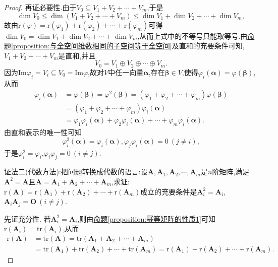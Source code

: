\documentclass[../../main.tex]{subfiles}
\begin{document}
\begin{proof}
再证必要性.由于\(V_0\subseteq V_1 + V_2+\cdots+V_m\),于是
\[
\dim V_0\leq\dim(V_1 + V_2+\cdots+V_m)\leq\dim V_1+\dim V_2+\cdots+\dim V_m,
\]
故由\(\text{r}(\varphi)=\text{r}(\varphi_1)+\text{r}(\varphi_2)+\cdots+\text{r}(\varphi_m)\)可得\(\dim V_0=\dim V_1+\dim V_2+\cdots+\dim V_m\),从而上式中的不等号只能取等号.由\hyperref[proposition:与全空间维数相同的子空间等于全空间]{命题\ref{proposition:与全空间维数相同的子空间等于全空间}}及直和的充要条件可知,\(V_1 + V_2+\cdots+V_m\)是直和,并且
\[
V_0 = V_1\oplus V_2\oplus\cdots\oplus V_m.
\]
因为\(\text{Im}\varphi_i = V_i\subseteq V_0 = \text{Im}\varphi\),故对\(V\)中任一向量\(\boldsymbol{\alpha}\),存在\(\boldsymbol{\beta}\in V\),使得\(\varphi_i(\boldsymbol{\alpha})=\varphi(\boldsymbol{\beta})\),从而
\begin{align*}
\varphi_i(\boldsymbol{\alpha})&=\varphi(\boldsymbol{\beta})=\varphi^2(\boldsymbol{\beta})=(\varphi_1+\varphi_2+\cdots+\varphi_m)\varphi(\boldsymbol{\beta})\\
&=(\varphi_1+\varphi_2+\cdots+\varphi_m)\varphi_i(\boldsymbol{\alpha})\\
&=\varphi_1\varphi_i(\boldsymbol{\alpha})+\varphi_2\varphi_i(\boldsymbol{\alpha})+\cdots+\varphi_m\varphi_i(\boldsymbol{\alpha}).
\end{align*}
由直和表示的唯一性可知
\[
\varphi_i^2(\boldsymbol{\alpha})=\varphi_i(\boldsymbol{\alpha}),\varphi_j\varphi_i(\boldsymbol{\alpha}) = 0\ (j\neq i),
\]
于是\(\varphi_i^2 = \varphi_i\),\(\varphi_i\varphi_j = 0\ (i\neq j)\).

{\color{blue}证法二(代数方法):}把问题转换成代数的语言:设\(\boldsymbol{A},\boldsymbol{A}_1,\boldsymbol{A}_2,\cdots,\boldsymbol{A}_m\)是\(n\)阶矩阵,满足\(\boldsymbol{A}^2 = \boldsymbol{A}\)且\(\boldsymbol{A}=\boldsymbol{A}_1+\boldsymbol{A}_2+\cdots+\boldsymbol{A}_m\),求证:\(\text{r}(\boldsymbol{A})=\text{r}(\boldsymbol{A}_1)+\text{r}(\boldsymbol{A}_2)+\cdots+\text{r}(\boldsymbol{A}_m)\)成立的充要条件是\(\boldsymbol{A}_i^2 = \boldsymbol{A}_i\),\(\boldsymbol{A}_i\boldsymbol{A}_j = \boldsymbol{O}\ (i\neq j)\).

先证充分性. 若\(\boldsymbol{A}_i^2 = \boldsymbol{A}_i\),则由\hyperref[proposition:幂等矩阵的性质1]{命题\ref{proposition:幂等矩阵的性质1}}可知\(\text{r}(\boldsymbol{A}_i)=\text{tr}(\boldsymbol{A}_i)\),从而
\begin{align*}
\text{r}(\boldsymbol{A})&=\text{tr}(\boldsymbol{A})=\text{tr}(\boldsymbol{A}_1+\boldsymbol{A}_2+\cdots+\boldsymbol{A}_m)\\
&=\text{tr}(\boldsymbol{A}_1)+\text{tr}(\boldsymbol{A}_2)+\cdots+\text{tr}(\boldsymbol{A}_m)=\text{r}(\boldsymbol{A}_1)+\text{r}(\boldsymbol{A}_2)+\cdots+\text{r}(\boldsymbol{A}_m).
\end{align*}


\end{proof}
\end{document}
